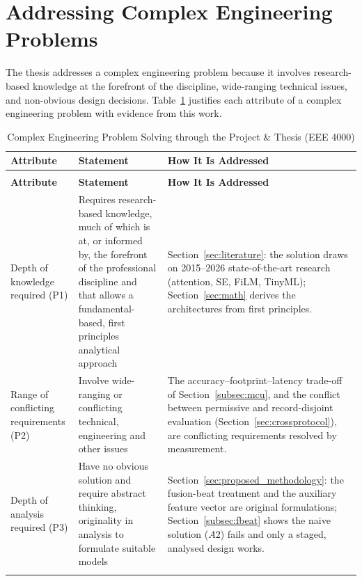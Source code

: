 \section{Addressing Complex Engineering Problems}
\label{sec:cep}

The thesis addresses a complex engineering problem because it involves
research-based knowledge at the forefront of the discipline, wide-ranging
technical issues, and non-obvious design decisions. Table~\ref{tab:cep_mapping}
justifies each attribute of a complex engineering problem with evidence from
this work.

\begin{longtable}{@{}>{\raggedright\arraybackslash}p{1.4in}>{\raggedright\arraybackslash}p{2.4in}>{\raggedright\arraybackslash}p{1.4in}@{}}
\caption{Complex Engineering Problem Solving through the Project \& Thesis (EEE 4000)}
\label{tab:cep_mapping} \\
\toprule
\textbf{Attribute} & \textbf{Statement} & \textbf{How It Is Addressed} \\
\midrule
\endfirsthead
\multicolumn{3}{@{}l}{\small\textit{Table \thetable\ continued from the previous page}} \\
\toprule
\textbf{Attribute} & \textbf{Statement} & \textbf{How It Is Addressed} \\
\midrule
\endhead
\bottomrule
\endfoot

Depth of knowledge required (P1) & Requires research-based knowledge, much
of which is at, or informed by, the forefront of the professional discipline
and that allows a fundamental-based, first principles analytical approach
& Section~\ref{sec:literature}: the solution draws on 2015--2026
state-of-the-art research
(attention, SE, FiLM, TinyML); Section~\ref{sec:math} derives the
architectures from first principles. \\
\addlinespace

Range of conflicting requirements (P2) & Involve wide-ranging or conflicting
technical, engineering and other issues
& The accuracy--footprint--latency trade-off of Section~\ref{subsec:mcu},
and the conflict between permissive and record-disjoint evaluation
(Section~\ref{sec:crossprotocol}), are conflicting requirements resolved by
measurement. \\
\addlinespace

Depth of analysis required (P3) & Have no obvious solution and require
abstract thinking, originality in analysis to formulate suitable models
& Section~\ref{sec:proposed_methodology}: the fusion-beat treatment and the
auxiliary feature vector
are original formulations; Section~\ref{subsec:fbeat} shows the naive
solution ($A2$)
fails and only a staged, analysed design works. \\
\addlinespace


\end{longtable}
